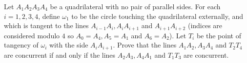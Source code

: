 Let $A_1A_2A_3A_4$ be a quadrilateral with no pair of parallel sides. For each $i=1, 2, 3, 4$, define $\omega_1$ to be the circle touching the quadrilateral externally, and which is tangent to the lines $A_{i-1}A_i, A_iA_{i+1}$ and $A_{i+1}A_{i+2}$ (indices are considered modulo $4$ so $A_0=A_4, A_5=A_1$ and $A_6=A_2$). Let $T_i$ be the point of tangency of $\omega_i$ with the side $A_iA_{i+1}$. Prove that the lines $A_1A_2, A_3A_4$ and $T_2T_4$ are concurrent if and only if the lines $A_2A_3, A_4A_1$ and $T_1T_3$ are concurrent.